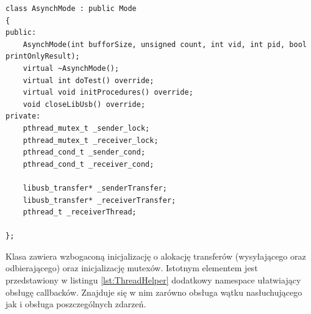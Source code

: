 \documentclass{BscUS}
\begin{document}
\begin{lstlisting}[caption={Deklaracja klasy AsynchMode},label={lst:CAsynchMode}]
class AsynchMode : public Mode
{
public:
	AsynchMode(int bufforSize, unsigned count, int vid, int pid, bool printOnlyResult);
	virtual ~AsynchMode();
	virtual int doTest() override;
	virtual void initProcedures() override;
	void closeLibUsb() override;
private:
	pthread_mutex_t _sender_lock;
	pthread_mutex_t _receiver_lock;
	pthread_cond_t _sender_cond;
	pthread_cond_t _receiver_cond;

	libusb_transfer* _senderTransfer;
	libusb_transfer* _receiverTransfer;
	pthread_t _receiverThread;

};
\end{lstlisting}
Klasa zawiera wzbogaconą inicjalizację o alokację transferów (wysyłającego oraz odbierającego) oraz inicjalizację mutexów.
Istotnym elementem jest przedstawiony w listingu \ref{lst:ThreadHelper} dodatkowy namespace ułatwiający obsługę callbacków. Znajduje się w nim zarówno obsługa wątku nasłuchującego jak i obsługa poszczególnych zdarzeń.
\end{document}
